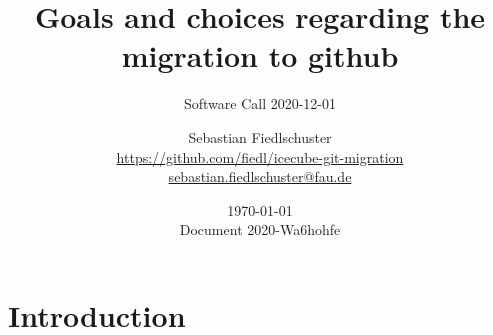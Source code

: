 \documentclass{beamer}
\title{Goals and choices regarding the migration to github}
\subtitle{Software Call 2020-12-01}
\date{\today \\ \vspace*{2mm}\tiny{Document 2020-Wa6hohfe} \normalsize}
\author[Sebastian Fiedlschuster]{Sebastian Fiedlschuster \\ \small\url{https://github.com/fiedl/icecube-git-migration} \\
\small\url{sebastian.fiedlschuster@fau.de}}
\institute{Erlangen Centre for Astroparticle Physics}
\newif\ifplacelogo %
\begin{document}



\placelogofalse

\newcommand\done{\checkmark\xspace}
\newcommand\inprogress{$\Rightarrow$\xspace}
\newcommand\tobedone{$\square$\xspace}

\newcommand\question[1]{\colorbox{blue!10}{\fbox{\ \ \questionicon \ \ #1}}}

\section{Introduction}

%



%
%
%
%
%
%
%

%
%
%
%
%
\end{document}
